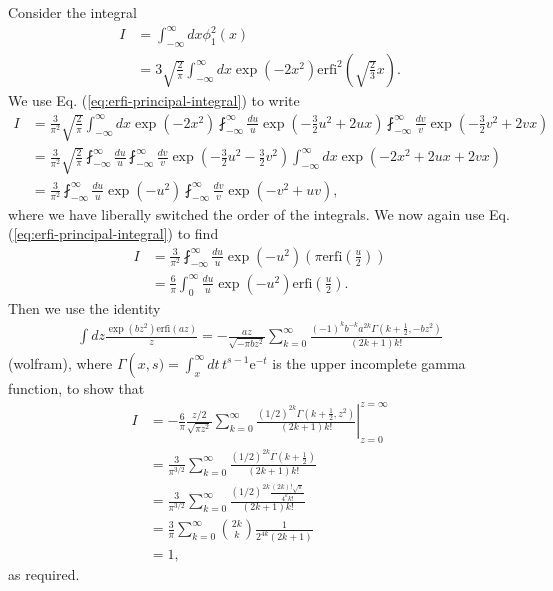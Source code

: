 \documentclass[11pt,letterpaper]{article}
\newcommand{\eq}[1]{\begin{align}#1\end{align}}
\newcommand{\erfi}{\text{erfi}}
\begin{document}
Consider the integral
\eq{
	I&=\int_{-\infty}^\infty dx \phi_1^2\left(x\right) \\
	&=3\sqrt{\frac{2}{\pi}}\int_{-\infty}^\infty dx\exp\left(-2x^2\right)\erfi^2\left(\sqrt{\frac{2}{3}}x\right).
}
We use Eq. (\ref{eq:erfi-principal-integral}) to write
\eq{
	I&=\frac{3}{\pi^2}\sqrt{\frac{2}{\pi}}\int_{-\infty}^\infty dx\exp\left(-2x^2\right)\fint_{-\infty}^\infty \frac{du}{u} \exp\left(-\frac{3}{2}u^2+2ux\right)\fint_{-\infty}^\infty \frac{dv}{v} \exp\left(-\frac{3}{2}v^2+2vx\right)\\
	&=\frac{3}{\pi^2}\sqrt{\frac{2}{\pi}}\fint_{-\infty}^\infty \frac{du}{u}\fint_{-\infty}^\infty \frac{dv}{v}
	\exp\left(-\frac{3}{2}u^2-\frac{3}{2}v^2\right) \int_{-\infty}^\infty dx \exp\left(-2x^2+2ux+2vx\right)\\
	&=\frac{3}{\pi^2}\fint_{-\infty}^\infty \frac{du}{u}\exp\left(-u^2\right)\fint_{-\infty}^\infty \frac{dv}{v}
	\exp\left(-v^2+uv\right),
}
where we have liberally switched the order of the integrals. We now again use Eq. (\ref{eq:erfi-principal-integral}) to find
\eq{
	I&=\frac{3}{\pi^2}\fint_{-\infty}^\infty \frac{du}{u}\exp\left(-u^2\right)\left(\pi\erfi\left(\frac{u}{2}\right)\right)\\
	&=\frac{6}{\pi}\int_{0}^\infty \frac{du}{u}\exp\left(-u^2\right)\erfi\left(\frac{u}{2}\right).
}
Then we use the identity
\eq{
	\int dz\frac{\exp\left(bz^2\right)\erfi\left(az\right)}{z}=-\frac{az}{\sqrt{-\pi bz^2}}\sum_{k=0}^{\infty}\frac{\left(-1\right)^kb^{-k}a^{2k}\Gamma\left(k+\frac{1}{2},-bz^2\right)}{\left(2k+1\right)k!}
}
(wolfram), where $\Gamma\left(x,s)=\int_{x}^{\infty}dt \,t^{s-1}\text{e}^{-t}$ is the upper incomplete gamma function, to show that
\eq{
	I&=\left.-\frac{6}{\pi}\frac{z/2}{\sqrt{\pi z^2}}\sum_{k=0}^{\infty}\frac{\left(1/2\right)^{2k}\Gamma\left(k+\frac{1}{2},z^2\right)}{\left(2k+1\right)k!}\right|_{z=0}^{z=\infty}\\
	&=\frac{3}{\pi^{3/2}}\sum_{k=0}^{\infty}\frac{\left(1/2\right)^{2k}\Gamma\left(k+\frac{1}{2}\right)}{\left(2k+1\right)k!}\\
	&=\frac{3}{\pi^{3/2}}\sum_{k=0}^{\infty}\frac{\left(1/2\right)^{2k}\frac{\left(2k\right)!\sqrt{\pi}}{4^kk!}}{\left(2k+1\right)k!}\\
	&=\frac{3}{\pi}\sum_{k=0}^{\infty}\binom{2k}{k}\frac{1}{2^{4k}\left(2k+1\right)}\\
	&=1,
}
as required.
\end{document}
